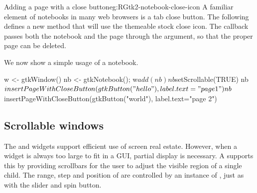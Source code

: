 \begin{example}{Adding a page with a close button}{eg:RGtk2-notebook-close-icon}
  A familiar element of notebooks in many web browsers is a tab close
  button. The following defines a new method
   that will use the
  themeable stock close icon.  The callback passes both the notebook
  and the page through the  argument, so that the proper
  page can be deleted.

\begin{Schunk}
\end{Schunk}

We now show a simple usage of a notebook.
\begin{Schunk}
\begin{Sinput}
 w <- gtkWindow()
 nb <- gtkNotebook(); w$add(nb)
 nb$setScrollable(TRUE)
 nb$insertPageWithCloseButton(gtkButton("hello"), 
                              label.text="page 1")
 nb$insertPageWithCloseButton(gtkButton("world"), 
                              label.text="page 2")
\end{Sinput}
\end{Schunk}
  
\end{example}


\subsection{Scrollable windows}
\label{sec:RGtk2:scroll-windows}

The  and  widgets support
efficient use of screen real estate. However, when a widget is always
too large to fit in a GUI, partial display is necessary. A
 supports this by providing scrollbars for
the user to adjust the visible region of a single child. The range, step
and position of  are controlled by an instance of
, just as with the slider and spin button.


